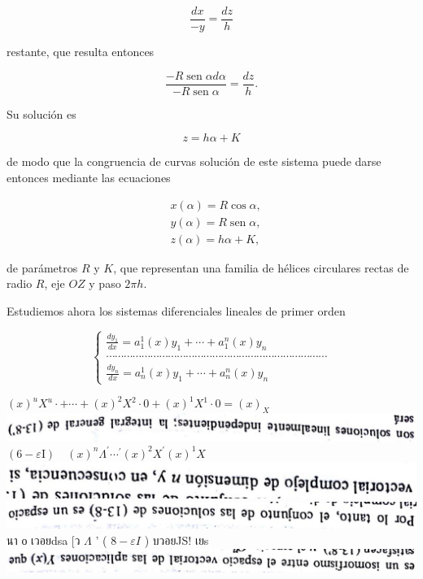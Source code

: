 \documentclass[10pt]{article}
\theoremstyle{plain}
\theoremstyle{definition}
\theoremstyle{remark}
\begin{document}
$$
\frac{d x}{-y}=\frac{d z}{h}
$$

restante, que resulta entonces

$$
\frac{-R \operatorname{sen} \alpha d \alpha}{-R \operatorname{sen} \alpha}=\frac{d z}{h} .
$$

Su solución es

$$
z=h \alpha+K
$$

de modo que la congruencia de curvas solución de este sistema puede darse entonces mediante las ecuaciones

$$
\begin{aligned}
& x(\alpha)=R \cos \alpha, \\
& y(\alpha)=R \operatorname{sen} \alpha, \\
& z(\alpha)=h \alpha+K,
\end{aligned}
$$

de parámetros $R$ y $K$, que representan una familia de hélices circulares rectas de radio $R$, eje $O Z$ y paso $2 \pi h$.

Estudiemos ahora los sistemas diferenciales lineales de primer orden

\[
\left\{\begin{array}{l}
\frac{d y_{1}}{d x}=a_{1}^{1}(x) y_{1}+\cdots+a_{1}^{n}(x) y_{n}  \tag{13-8}\\
\cdots \cdots \cdots \cdots \cdots \cdots \cdots \cdots \cdots \cdots \cdots \cdots \cdots \cdots \cdots \cdots \cdots \cdots \cdots \cdots \cdots \cdots \cdots \cdots \cdots \\
\frac{d y_{n}}{d x}=a_{n}^{1}(x) y_{1}+\cdots+a_{n}^{n}(x) y_{n}
\end{array}\right.
\]

$(x)^{u} X^{u} \cdot+\cdots+(x)^{2} X^{2} \cdot 0+(x)^{1} X^{1} \cdot 0=(x)_{X}$\\
\includegraphics[max width=\textwidth, center]{2025_09_05_adecef5eb2053bc129b5g-331(8)}\\
$(6-\varepsilon \mathrm{I}) \quad(x)^{n} \Lambda^{\prime} \cdots{ }^{\prime}(x)^{2} X^{\prime}(x)^{1} X$\\
\includegraphics[max width=\textwidth, center]{2025_09_05_adecef5eb2053bc129b5g-331(3)}\\
\includegraphics[max width=\textwidth]{2025_09_05_adecef5eb2053bc129b5g-331(5)} นา о เวอยdsa [ว $\Lambda$ ' ( $8-\varepsilon I$ ) บวอยJS! เยs\\
\includegraphics[max width=\textwidth, center]{2025_09_05_adecef5eb2053bc129b5g-331(10)}
\end{document}
